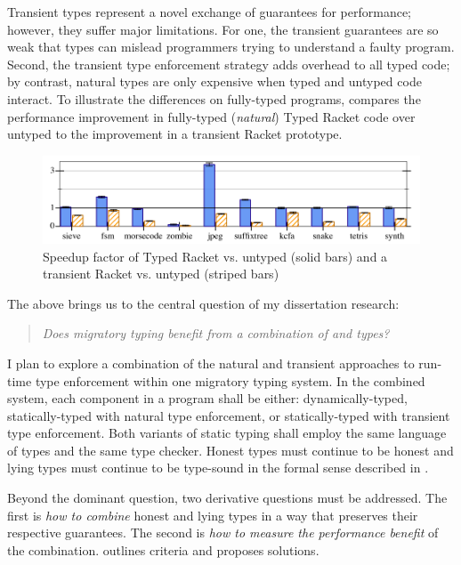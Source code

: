 Transient types represent a novel exchange of guarantees for performance;
 however, they suffer major limitations.
For one, the transient guarantees are so weak that types can mislead
 programmers trying to understand a faulty program.
Second, the transient type enforcement strategy adds overhead to all typed code;
 by contrast, natural types are only expensive when typed and untyped code interact.
To illustrate the differences on fully-typed programs,
  compares the performance improvement
 in fully-typed (\emph{natural}\/) Typed Racket code over untyped to the improvement in a
 transient Racket prototype.

\begin{figure}[h]
  \includegraphics[width=0.8\columnwidth]{src/icfp-bars.png}
  \caption{Speedup factor of Typed Racket vs. untyped (solid bars) and a transient Racket vs. untyped (striped bars)~\cite{gf-icfp-2018}}
  \label{fig:icfp-bars}
\end{figure}

\noindent
The above brings us to the central question of my dissertation research:

\begin{quote}
  \emph{Does migratory typing benefit from a combination of \tdeep{} and \tshallow{} types?}
\end{quote}

I plan to explore a combination of the natural and transient approaches to
 run-time type enforcement within one migratory typing system.
In the combined system, each component in a program shall be either:
 dynamically-typed,
 statically-typed with natural type enforcement,
 or statically-typed with transient type enforcement.
Both variants of static typing shall employ the same language of types and the
 same type checker.
Honest types must continue to be honest
 and lying types must continue to be type-sound
 in the formal sense described in .

Beyond the dominant question, two derivative questions must be addressed.
The first is \emph{how to combine}\/ honest and lying
 types in a way that preserves their respective guarantees.
The second is \emph{how to measure the performance benefit}\/ of the combination.
 outlines criteria and proposes solutions.

